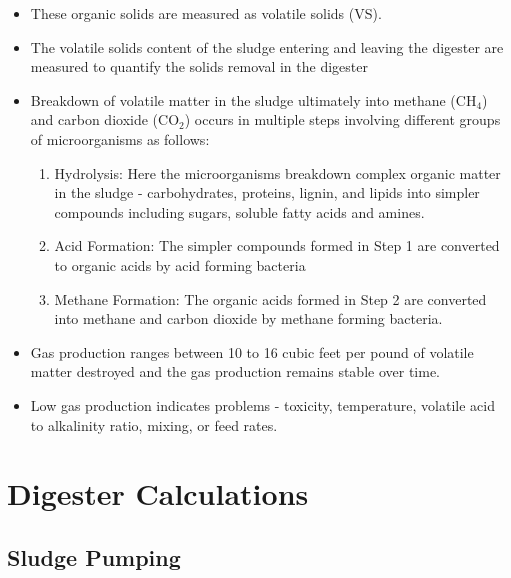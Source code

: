 \begin{itemize}
\begin{enumerate}[1. ]
			\end{enumerate}     
		\item These organic solids are measured as volatile solids (VS).  
		\item The volatile solids content of the sludge entering and leaving the digester are measured to quantify the solids removal in the digester
		 \item Breakdown of volatile matter in the sludge ultimately into methane (CH$_4$) and carbon dioxide (CO$_2$) occurs in multiple steps involving different groups of microorganisms as follows:\\
			\begin{enumerate}[Step 1.]
			\item Hydrolysis:  Here the microorganisms breakdown complex organic matter in the sludge - carbohydrates, proteins, lignin, and lipids into simpler compounds including sugars, soluble fatty acids and amines.\\
			\item Acid Formation:  The simpler compounds formed in Step 1 are converted to organic acids by acid forming bacteria\\
			\item Methane Formation: The organic acids formed in Step 2 are converted into methane and carbon dioxide by methane forming bacteria.\\
			\end{enumerate}
		\item Gas production ranges between 10 to 16 cubic feet per pound of volatile matter destroyed and the gas production remains stable over time.
		\item Low gas production indicates problems - toxicity, temperature, volatile acid to alkalinity ratio, mixing, or feed rates.
		\end{itemize}
\section{Digester Calculations}
\subsection{Sludge Pumping}
			
